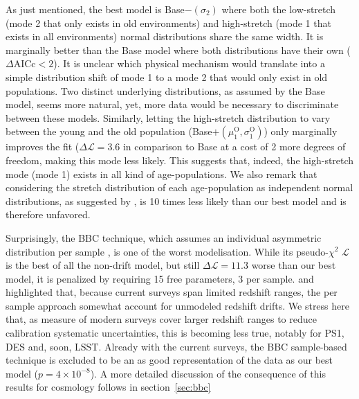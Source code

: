 \documentclass[]{aa} %
\newcommand{\mr}[1]{{\textcolor[rgb]{0.60,0.10,0.6}{#1}}}
\begin{document}
\mr{As just mentioned, the best model is Base$-(\sigma_2)$ where both the
    low-stretch (mode 2 that only exists in old environments) and high-stretch
    (mode 1 that exists in all environments) normal distributions share the same
    width. It is marginally better than the Base model where both distributions
    have their own ($\Delta \mathrm{AICc}<2$). It is unclear which physical
    mechanism would translate into a simple distribution shift of mode 1 to a
    mode 2 that would only exist in old populations. Two distinct underlying
    distributions, as assumed by the Base model, seems more natural, yet, more
    data would be necessary to discriminate between these models.  Similarly,
letting the high-stretch distribution to vary between the young and the old
population (Base$+(\mu_1^{\mathrm{O}}, \sigma_1^{\mathrm{O}})$) only marginally
improves the fit ($\Delta\mathcal{L}=3.6$ in comparison to Base at a cost of 2
more degrees of freedom, making this mode less likely. This suggests that,
indeed, the high-stretch mode (mode 1) exists in all kind of age-populations.}
\mr{We also remark that considering the stretch distribution of each
age-population as independent normal distributions, as suggested by
\cite{howell2007}, is 10 times less likely than our best model and is therefore
unfavored.}

\mr{Surprisingly, the BBC technique, which assumes an individual asymmetric
    distribution per sample \citep{scolnic2016,kessler2017}, is one of the worst
    modelisation.  While its pseudo-$\chi^{2}$ $\mathcal{L}$ is the best of all
    the non-drift model, but still $\Delta \mathcal{L}=11.3$ worse than our best
    model, it is penalized by requiring 15 free parameters, 3 per sample.
    \citet[][section~2]{scolnic2016} and \citet[][section~5.4]{scolnic2018a}
    highlighted that, because current surveys span limited redshift ranges, the
    per sample approach somewhat account for unmodeled redshift drifts. We
    stress here that, as measure of modern surveys cover larger redshift ranges
    to reduce calibration systematic  uncertainties, this is becoming less true,
    notably for PS1, DES and, soon, LSST. Already with the current surveys, the
    BBC sample-based technique is excluded to be an as good representation of
    the data as our best model ($p=4\times 10^{-8}$).  A more detailed
discussion of the consequence of this results for cosmology follows in
section~\ref{sec:bbc}}
\end{document}
